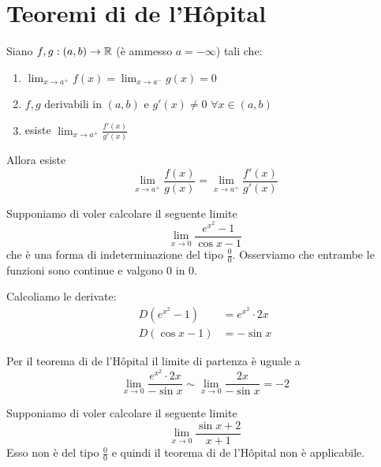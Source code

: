 \section{Teoremi di de l'Hôpital}

\begin{theorem}
Siano $f, g : (a,b) \to \mathbb R$ (è ammesso $a = -\infty$) tali che:
\begin{enumerate}
\item $\lim_{x \to a^+} f(x) = \lim_{x \to a^-} g(x) = 0$
\item $f,g$ derivabili in $(a,b)$ e $g'(x) \neq 0$ $\forall x \in (a,b)$
\item esiste $\lim_{x \to a^+} \frac{f'(x)}{g'(x)}$
\end{enumerate}

Allora esiste
\begin{equation*}
\lim_{x \to a^+} \frac{f(x)}{g(x)} = \lim_{x \to a^+} \frac{f'(x)}{g'(x)}
\end{equation*}
\end{theorem}

\begin{example}
Supponiamo di voler calcolare il seguente limite
\begin{equation*}
\lim_{x \to 0} \frac{e^{x^2}-1}{\cos x -1}
\end{equation*}
che è una forma di indeterminazione del tipo $\frac{0}{0}$. Osserviamo che entrambe le funzioni sono continue e valgono 0 in 0.

Calcoliamo le derivate:
\begin{align*}
D (e^{x^2}-1) &= e^{x^2} \cdot 2x \\
D (\cos x -1) &= -\sin x
\end{align*}

Per il teorema di de l'Hôpital il limite di partenza è uguale a
\begin{equation*}
\lim_{x \to 0} \frac{e^{x^2} \cdot 2x}{-\sin x} \sim \lim_{x \to 0} \frac{2x}{-\sin x} = -2
\end{equation*}
\end{example}

\begin{example}
Supponiamo di voler calcolare il seguente limite
\begin{equation*}
\lim_{x \to 0} \frac{\sin x + 2}{x+1}
\end{equation*}
Esso non è del tipo $\frac{0}{0}$ e quindi il teorema di de l'Hôpital non è applicabile.
\end{example}

